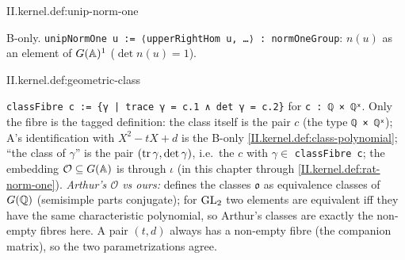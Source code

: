 \begin{definition}
\bonly
{}
\end{definition}
\begin{tfformal}{II.kernel.def:unip-norm-one}
\begin{tffidelity}
B-only. \texttt{unipNormOne u := ⟨upperRightHom u, …⟩ : normOneGroup}: $n(u)$ as an element of $G(\mathbb{A})^1$ ($\det n(u)=1$).
\end{tffidelity}
\end{tfformal}

\begin{definition}
\end{definition}
\begin{tfformal}{II.kernel.def:geometric-class}
\begin{tffidelity}
\texttt{classFibre c := \{γ | trace γ = c.1 ∧ det γ = c.2\}} for \texttt{c : ℚ × ℚˣ}. Only the fibre is the tagged definition: the class itself is the pair $c$ (the type \texttt{ℚ × ℚˣ}); A's identification with $X^2-tX+d$ is the B-only \cref{II.kernel.def:class-polynomial}; ``the class of $\gamma$'' is the pair $(\operatorname{tr}\gamma,\det\gamma)$, i.e.\ the $c$ with $\gamma\in$ \texttt{classFibre c}; the embedding $\mathcal O\subseteq G(\mathbb{A})$ is through $\iota$ (in this chapter through \cref{II.kernel.def:rat-norm-one}). \emph{Arthur's $\mathcal O$ vs ours:} \cite[§10]{AIntro} defines the classes $\mathfrak o$ as equivalence classes of $G(\mathbb{Q})$ (semisimple parts conjugate); for $\mathrm{GL}_2$ two elements are equivalent iff they have the same characteristic polynomial, so Arthur's classes are exactly the non-empty fibres here. A pair $(t,d)$ always has a non-empty fibre (the companion matrix), so the two parametrizations agree.
\end{tffidelity}
\end{tfformal}

